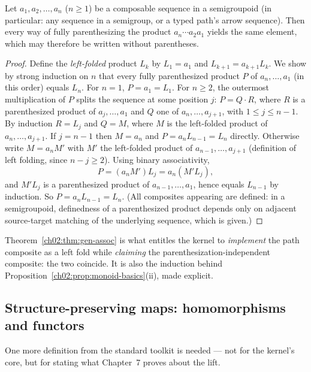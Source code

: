 \begin{theorem}\label{ch02:thm:gen-assoc}
Let $a_1, a_2, \dots, a_n$ ($n \geq 1$) be a composable sequence in a
semigroupoid (in particular: any sequence in a semigroup, or a typed
path's arrow sequence). Then every way of fully parenthesizing the product
$a_n \cdots a_2 a_1$ yields the same element, which may therefore be
written without parentheses.
\end{theorem}

\begin{proof}
Define the \emph{left-folded} product $L_k$ by $L_1 = a_1$ and
$L_{k+1} = a_{k+1} L_k$. We show by strong induction on $n$ that every
fully parenthesized product $P$ of $a_n, \dots, a_1$ (in this order)
equals $L_n$. For $n = 1$, $P = a_1 = L_1$. For $n \geq 2$, the
outermost multiplication of $P$ splits the sequence at some position
$j$: $P = Q \cdot R$, where $R$ is a parenthesized product of
$a_j, \dots, a_1$ and $Q$ one of $a_n, \dots, a_{j+1}$, with
$1 \leq j \leq n - 1$. By induction $R = L_j$ and $Q = M$, where $M$ is
the left-folded product of $a_n, \dots, a_{j+1}$. If $j = n - 1$ then
$M = a_n$ and $P = a_n L_{n-1} = L_n$ directly. Otherwise write
$M = a_n M'$ with $M'$ the left-folded product of
$a_{n-1}, \dots, a_{j+1}$ (definition of left folding, since
$n - j \geq 2$). Using binary associativity,
\[
P = (a_n M') L_j = a_n (M' L_j),
\]
and $M' L_j$ is a parenthesized product of $a_{n-1}, \dots, a_1$, hence
equals $L_{n-1}$ by induction. So $P = a_n L_{n-1} = L_n$. (All
composites appearing are defined: in a semigroupoid, definedness of a
parenthesized product depends only on adjacent source-target matching of
the underlying sequence, which is given.)
\end{proof}

\begin{remark}\label{ch02:rem:fold-order}
Theorem~\ref{ch02:thm:gen-assoc} is what entitles the kernel to
\emph{implement} the path composite as a left fold while \emph{claiming}
the parenthesization-independent composite: the two coincide. It is also
the induction behind Proposition~\ref{ch02:prop:monoid-basics}(ii), made
explicit.
\end{remark}

\subsection{Structure-preserving maps: homomorphisms and functors}

One more definition from the standard toolkit is needed --- not for the
kernel's core, but for stating what Chapter~7 proves about the lift.

